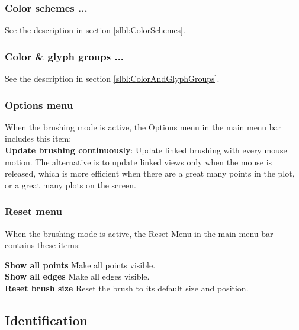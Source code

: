 \documentclass[11pt]{article}
\begin{document}
\subsubsection{Color schemes ...}

See the description in section \ref{slbl:ColorSchemes}.

\subsubsection{Color \& glyph groups ...}

See the description in section \ref{slbl:ColorAndGlyphGroups}.

\subsubsection{Options menu}
%
When the brushing mode is active, the Options menu in the main
menu bar includes this item:
\medskip
\noindent
\\{\bf Update brushing continuously}: Update linked
  brushing with every mouse motion.  The alternative is to update linked
  views only when the mouse is released, which is more efficient when
  there are a great many points in the plot, or a great many plots on
  the screen.

\subsubsection{Reset menu}
%
When the brushing mode is active, the Reset Menu in the main
menu bar contains these items:

\begin{tabbing}
 {\bf Show all points} \hspace{.5in} \= Make all points visible. \\
 {\bf Show all edges} \> Make all edges visible. \\
 {\bf Reset brush size} \> Reset the brush to its default size and position. \\
\end{tabbing}
%

\subsection{Identification}
\label{slbl:Identify}
\end{document}

